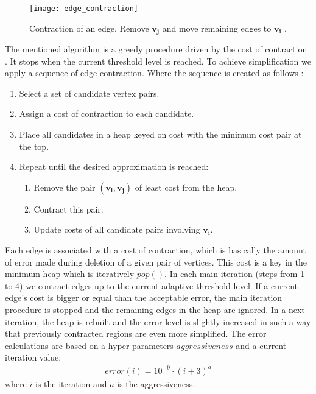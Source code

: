 \begin{figure}[h!]
  \begin{center}
    \texttt{[image: edge\_contraction]}
    \caption{Contraction of an edge. Remove $\mathbf{v_j}$ and move remaining edges to $\mathbf{v_i}$ \cite{garland99}.}
    \label{fig:edge_contraction_ref}
  \end{center}
\end{figure}

The mentioned algorithm is a greedy procedure driven by the cost of contraction \cite{cormen01}. It stops when the current threshold level is reached. To achieve simplification we apply a sequence of edge contraction. Where the sequence is created as follows \cite{garland97}:

\begin{enumerate}
\item Select a set of candidate vertex pairs.
\item Assign a cost of contraction to each candidate.
\item Place all candidates in a heap keyed on cost with the minimum cost pair at the top.
\item Repeat until the desired approximation is reached:
\begin{enumerate}
\item Remove the pair $(\mathbf{v_i}, \mathbf{v_j})$ of least cost from the heap.
\item Contract this pair.
\item Update costs of all candidate pairs involving $\mathbf{v_i}$.
\end{enumerate}
\end{enumerate}

Each edge is associated with a cost of contraction, which is basically the amount of error made during deletion of a given pair of vertices. This cost is a key in the minimum heap \cite{cormen01} which is iteratively $pop()$. In each main iteration (steps from 1 to 4) we contract edges up to the current adaptive threshold level. If a current edge's cost is bigger or equal than the acceptable error, the main iteration procedure is stopped and the remaining edges in the heap are ignored. In a next iteration, the heap is rebuilt and the error level is slightly increased in such a way that previously contracted regions are even more simplified. The error calculations are based on a hyper-parameters $aggressiveness$ and a current iteration value:
\begin{align}
error(i)=10^{-9}\cdot(i+3)^a
\label{error_formula}
\end{align}
where $i$ is the iteration and $a$ is the aggressiveness.

